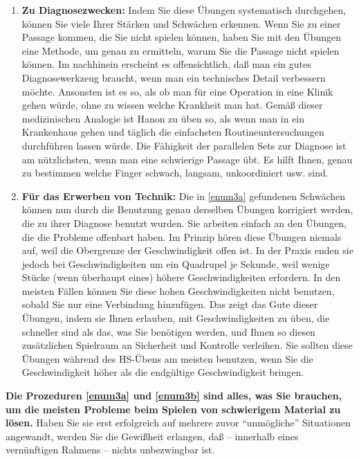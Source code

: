 \begin{enumerate}[label={(\roman*)}]
\item \label{enum3a} \textbf{Zu Diagnosezwecken:} Indem Sie diese Übungen systematisch durchgehen, können Sie viele Ihrer Stärken und Schwächen erkennen.
Wenn Sie zu einer Passage kommen, die Sie nicht spielen können, haben Sie mit den Übungen eine Methode, um genau zu ermitteln, warum Sie die Passage nicht spielen können.
Im nachhinein erscheint es offensichtlich, daß man ein gutes Diagnosewerkzeug braucht, wenn man ein technisches Detail verbessern möchte.
Ansonsten ist es so, als ob man für eine Operation in eine Klinik gehen würde, ohne zu wissen welche Krankheit man hat.
Gemäß dieser medizinischen Analogie ist Hanon zu üben so, als wenn man in ein Krankenhaus gehen und täglich die einfachsten Routineuntersuchungen durchführen lassen würde.
Die Fähigkeit der parallelen Sets zur Diagnose ist am nützlichsten, wenn man eine schwierige Passage übt.
Es hilft Ihnen, genau zu bestimmen welche Finger schwach, langsam, unkoordiniert usw. sind.


\item \label{enum3b} \textbf{Für das Erwerben von Technik:} Die in \ref{enum3a} gefundenen Schwächen können nun durch die Benutzung genau derselben Übungen korrigiert werden, die zu ihrer Diagnose benutzt wurden.
Sie arbeiten einfach an den Übungen, die die Probleme offenbart haben.
Im Prinzip hören diese Übungen niemals auf, weil die Obergrenze der Geschwindigkeit offen ist.
In der Praxis enden sie jedoch bei Geschwindigkeiten um ein Quadrupel je Sekunde, weil wenige Stücke (wenn überhaupt eines) höhere Geschwindigkeiten erfordern.
In den meisten Fällen können Sie diese hohen Geschwindigkeiten nicht benutzen, sobald Sie nur eine Verbindung hinzufügen.
Das zeigt das Gute dieser Übungen, indem sie Ihnen erlauben, mit Geschwindigkeiten zu üben, die schneller sind als das, was Sie benötigen werden, und Ihnen so diesen zusätzlichen Spielraum an Sicherheit und Kontrolle verleihen.
Sie sollten diese Übungen während des HS-Übens am meisten benutzen, wenn Sie die Geschwindigkeit höher als die endgültige Geschwindigkeit bringen.
\end{enumerate}

\textbf{Die Prozeduren \ref{enum3a} und \ref{enum3b} sind alles, was Sie brauchen, um die meisten Probleme beim Spielen von schwierigem Material zu lösen.}
Haben Sie sie erst erfolgreich auf mehrere zuvor \enquote{unmögliche} Situationen angewandt, werden Sie die Gewißheit erlangen, daß -- innerhalb eines vernünftigen Rahmens -- nichts unbezwingbar ist.

